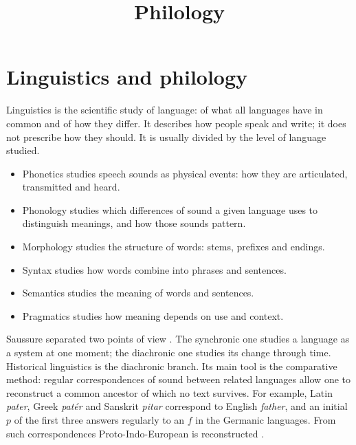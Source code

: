 



\title{Philology}
\maketitle

\label{section-phantom}

\tableofcontents

\section{Linguistics and philology}
\label{section-linguistics-and-philology}

Linguistics is the scientific study of
language: of what all languages have in
common and of how they differ. It describes
how people speak and write; it does not
prescribe how they should. It is usually
divided by the level of language studied.
\begin{itemize}
\item Phonetics studies speech sounds as
physical events: how they are articulated,
transmitted and heard.
\item Phonology studies which differences of
sound a given language uses to distinguish
meanings, and how those sounds pattern.
\item Morphology studies the structure of
words: stems, prefixes and endings.
\item Syntax studies how words combine into
phrases and sentences.
\item Semantics studies the meaning of words
and sentences.
\item Pragmatics studies how meaning depends
on use and context.
\end{itemize}

Saussure separated two points of view
\cite{saussure-cours}. The synchronic one
studies a language as a system at one moment;
the diachronic one studies its change
through time. Historical linguistics is the
diachronic branch. Its main tool is the
comparative method: regular correspondences
of sound between related languages allow one
to reconstruct a common ancestor of which no
text survives. For example, Latin
\emph{pater}, Greek \emph{patér} and Sanskrit
\emph{pitar} correspond to English
\emph{father}, and an initial $p$ of the
first three answers regularly to an $f$ in
the Germanic languages. From such
correspondences Proto-Indo-European is
reconstructed
\cite{campbell-historical-linguistics}.

